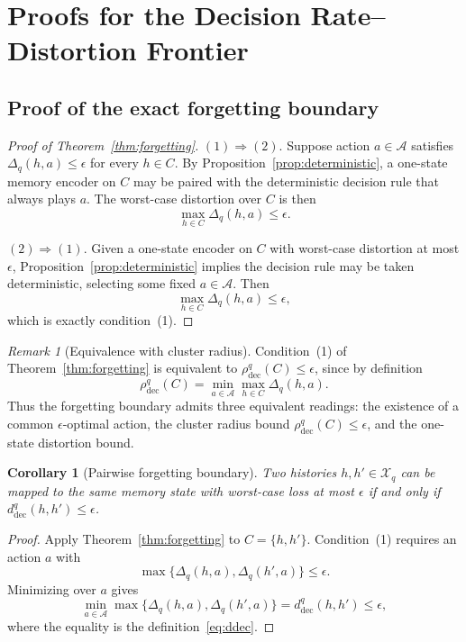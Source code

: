 \documentclass{article}
\theoremstyle{plain}
\newtheorem{corollary}{Corollary}
\theoremstyle{definition}
\theoremstyle{remark}
\newtheorem{remark}{Remark}
\newcommand{\cA}{\mathcal{A}}
\newcommand{\cX}{\mathcal{X}}
\newcommand{\eps}{\epsilon}
\begin{document}
\section{Proofs for the Decision Rate--Distortion Frontier}
\label{app:frontier}
\subsection{Proof of the exact forgetting boundary}
\label{app:proof-forgetting}

\begin{proof}[Proof of Theorem~\ref{thm:forgetting}]
$(1)\!\Rightarrow\!(2)$.\;
Suppose action \(a\in\cA\) satisfies \(\Delta_q(h,a)\le\eps\) for every
\(h\in C\). By Proposition~\ref{prop:deterministic}, a one-state memory
encoder on \(C\) may be paired with the deterministic decision rule that
always plays \(a\). The worst-case distortion over \(C\) is then
\[
\max_{h\in C}\Delta_q(h,a)\le\eps.
\]

$(2)\!\Rightarrow\!(1)$.\;
Given a one-state encoder on \(C\) with worst-case distortion at most \(\eps\),
Proposition~\ref{prop:deterministic} implies the decision rule may be taken
deterministic, selecting some fixed \(a\in\cA\). Then
\[
\max_{h\in C}\Delta_q(h,a)\le\eps,
\]
which is exactly condition~(1).
\end{proof}

\begin{remark}[Equivalence with cluster radius]
\label{rmk:rho-equiv}
Condition~(1) of Theorem~\ref{thm:forgetting} is equivalent to
\(\rho_{\mathrm{dec}}^q(C)\le\eps\), since by definition
\[
\rho_{\mathrm{dec}}^q(C)
=
\min_{a\in\cA}\max_{h\in C}\Delta_q(h,a).
\]
Thus the forgetting boundary admits three equivalent readings:
the existence of a common \(\eps\)-optimal action, the cluster radius bound
\(\rho_{\mathrm{dec}}^q(C)\le\eps\), and the one-state distortion bound.
\end{remark}

\begin{corollary}[Pairwise forgetting boundary]
\label{cor:forgetting-pair}
Two histories \(h,h'\in\cX_q\) can be mapped to the same memory state with
worst-case loss at most \(\eps\) if and only if
\(d_{\mathrm{dec}}^q(h,h')\le\eps\).
\end{corollary}

\begin{proof}
Apply Theorem~\ref{thm:forgetting} to \(C=\{h,h'\}\).
Condition~(1) requires an action \(a\) with
\[
\max\{\Delta_q(h,a),\Delta_q(h',a)\}\le\eps.
\]
Minimizing over \(a\) gives
\[
\min_{a\in\cA}\max\{\Delta_q(h,a),\Delta_q(h',a)\}
=
d_{\mathrm{dec}}^q(h,h')
\le\eps,
\]
where the equality is the definition~\eqref{eq:ddec}.
\end{proof}
\end{document}
